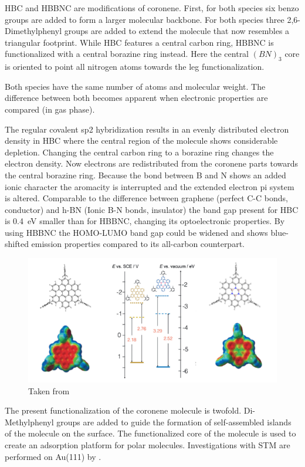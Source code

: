 HBC and HBBNC are modifications of coronene. First, for both species six benzo groups are added to form a larger molecular backbone. For both species three 2,6-Dimethylphenyl groups are added to extend the molecule that now resembles a triangular footprint. While HBC features a central carbon ring, HBBNC is functionalized with a central borazine ring instead. Here the central $(BN)_3$ core is oriented to point all nitrogen atoms towards the leg functionalization.

Both species have the same number of atoms and molecular weight. The difference between both becomes apparent when electronic properties are compared (in gas phase).

The regular covalent sp2 hybridization results in an evenly distributed electron density in HBC where the central region of the molecule shows considerable depletion. Changing the central carbon ring to a borazine ring changes the electron density. Now electrons are redistributed from the coronene parts towards the central borazine ring. Because the bond between B and N shows an added ionic character the aromacity is interrupted and the extended electron pi system is altered. Comparable to the difference between graphene (perfect C-C bonds, conductor) and h-BN (Ionic B-N bonds, insulator) the band gap present for HBC is \SI{0.4}{\eV} smaller than for HBBNC, changing its optoelectronic properties. By using HBBNC the HOMO-LUMO band gap could be widened and shows blue-shifted emission properties\cite{dosso_synthesis_2017} compared to its all-carbon counterpart.

\begin{figure}[]\centering
	\includegraphics[width=\textwidth]{./images/dosso-combined}
	\caption{Taken from \cite{dosso_synthesis_2017}}
	\label{}
\end{figure}

The present functionalization of the coronene molecule is twofold. Di-Methylphenyl groups are added to guide the formation of self-assembled islands of the molecule on the surface. The functionalized core of the molecule is used to create an adsorption platform for polar molecules.
Investigations with STM are performed on Au(111) by \cite{Krieg_construction_2015}.

